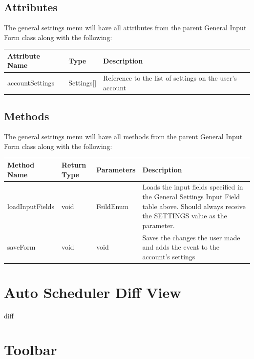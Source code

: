 \documentclass{scrreprt}
\begin{document}
\subsection{Attributes}

The general settings menu will have all attributes from the parent General Input Form class along with the following:

\begin{center}
\begin{longtable}{ | p{3cm} | p{3cm} | p{9cm} | }
\hline
\textbf{Attribute Name} & \textbf{Type} & \textbf{Description} \\
\hline
accountSettings & Settings[] & Reference to the list of settings on the user's account \\
\hline
\end{longtable}
\end{center}

\subsection{Methods}

The general settings menu will have all methods from the parent General Input Form class along with the following:

\begin{center}
\begin{longtable}{ | p{3cm} | p{2cm} | p{2cm} | p{8cm} | }
\hline
\textbf{Method Name} & \textbf{Return Type} & \textbf{Parameters} & \textbf{Description} \\
\hline
loadInputFields & void & FeildEnum & Loads the input fields specified in the General Settings Input Field table above. Should always receive the SETTINGS value as the parameter.\\
\hline
saveForm & void & void & Saves the changes the user made and adds the event to the account's settings \\
\hline
\end{longtable}
\end{center}

\section{Auto Scheduler Diff View}

diff

\section{Toolbar}
\end{document}
